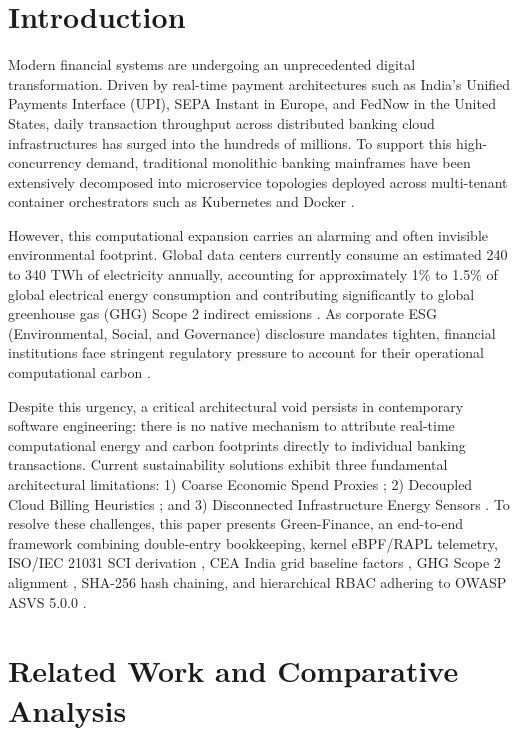 \documentclass[conference]{IEEEtran}
\begin{document}
\section{Introduction}
Modern financial systems are undergoing an unprecedented digital transformation. Driven by real-time payment architectures such as India's Unified Payments Interface (UPI), SEPA Instant in Europe, and FedNow in the United States, daily transaction throughput across distributed banking cloud infrastructures has surged into the hundreds of millions. To support this high-concurrency demand, traditional monolithic banking mainframes have been extensively decomposed into microservice topologies deployed across multi-tenant container orchestrators such as Kubernetes and Docker \cite{jeanquartier2026, unctad2025}.

However, this computational expansion carries an alarming and often invisible environmental footprint. Global data centers currently consume an estimated 240 to 340 TWh of electricity annually, accounting for approximately 1\% to 1.5\% of global electrical energy consumption and contributing significantly to global greenhouse gas (GHG) Scope 2 indirect emissions \cite{jeanquartier2026}. As corporate ESG (Environmental, Social, and Governance) disclosure mandates tighten, financial institutions face stringent regulatory pressure to account for their operational computational carbon \cite{nasir2025, adams2025}.

Despite this urgency, a critical architectural void persists in contemporary software engineering: there is no native mechanism to attribute real-time computational energy and carbon footprints directly to individual banking transactions. Current sustainability solutions exhibit three fundamental architectural limitations: 1) Coarse Economic Spend Proxies \cite{carbontrail2026, bnz2024}; 2) Decoupled Cloud Billing Heuristics \cite{ccf2024}; and 3) Disconnected Infrastructure Energy Sensors \cite{kepler2024, scaphandre2024}. To resolve these challenges, this paper presents Green-Finance, an end-to-end framework combining double-entry bookkeeping, kernel eBPF/RAPL telemetry, ISO/IEC 21031 SCI derivation \cite{iso21031}, CEA India grid baseline factors \cite{cea2023}, GHG Scope 2 alignment \cite{ghg2015}, SHA-256 hash chaining, and hierarchical RBAC adhering to OWASP ASVS 5.0.0 \cite{owasp2024}.

\section{Related Work and Comparative Analysis}
\end{document}
